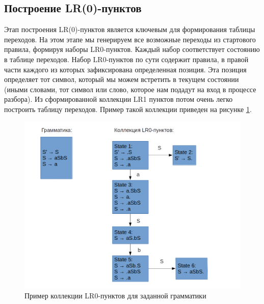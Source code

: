 \subsection{Построение LR(0)-пунктов}
Этап построения LR(0)-пунктов является ключевым для формирования таблицы переходов. На этом этапе мы генерируем все возможные переходы из стартового правила, формируя наборы LR0-пунктов. Каждый набор соответствует состоянию в таблице переходов. Набор LR0-пунктов по сути содержит правила, в правой части каждого из которых зафиксирована определенная позиция. Эта позиция определяет тот символ, который мы можем встретить в текущем состоянии (иными словами, тот символ или слово, которое нам подадут на вход в процессе разбора). Из сформированной коллекции LR1 пунктов потом очень легко построить таблицу переходов. Пример такой коллекции приведен на рисунке \ref{fig:LRItems}.
\begin{figure}%
\centering
\includegraphics[width=\textwidth]{img/LRItems.png}
\caption{Пример коллекции LR0-пунктов для заданной грамматики}
\label{fig:LRItems}
\end{figure}

